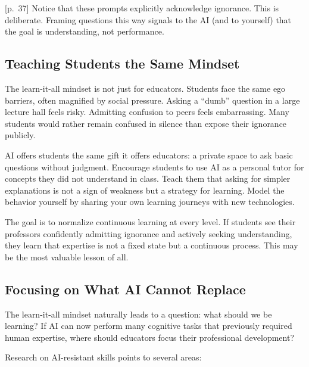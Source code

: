 \documentclass[
  letterpaper,
  DIV=11,
  numbers=noendperiod]{scrreprt}
\begin{document}
{[}p.~37{]} Notice that these prompts explicitly acknowledge ignorance.
This is deliberate. Framing questions this way signals to the AI (and to
yourself) that the goal is understanding, not performance.

\subsection{Teaching Students the Same
Mindset}\label{teaching-students-the-same-mindset}

The learn-it-all mindset is not just for educators. Students face the
same ego barriers, often magnified by social pressure. Asking a ``dumb''
question in a large lecture hall feels risky. Admitting confusion to
peers feels embarrassing. Many students would rather remain confused in
silence than expose their ignorance publicly.

AI offers students the same gift it offers educators: a private space to
ask basic questions without judgment. Encourage students to use AI as a
personal tutor for concepts they did not understand in class. Teach them
that asking for simpler explanations is not a sign of weakness but a
strategy for learning. Model the behavior yourself by sharing your own
learning journeys with new technologies.

The goal is to normalize continuous learning at every level. If students
see their professors confidently admitting ignorance and actively
seeking understanding, they learn that expertise is not a fixed state
but a continuous process. This may be the most valuable lesson of all.

\subsection{Focusing on What AI Cannot
Replace}\label{focusing-on-what-ai-cannot-replace}

The learn-it-all mindset naturally leads to a question: what should we
be learning? If AI can now perform many cognitive tasks that previously
required human expertise, where should educators focus their
professional development?

Research on AI-resistant skills points to several areas:
\end{document}
